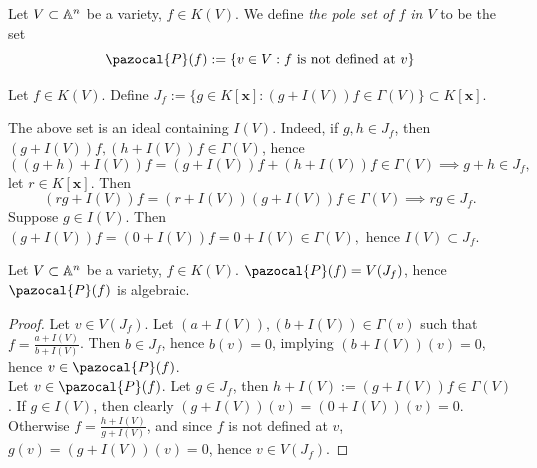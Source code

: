 \begin{definition}
    Let $V\subset \mathbb{A}^n$ be a variety, $f\in K(V)$. We define \textit{the pole set of $f$ in $V$} to be the set
    $$\pazocal{P}(f):= \left\{ v\in V : f \text{ is not defined at } v \right\}$$
\end{definition}
\begin{definition}
    Let $f\in K(V)$. Define $J_f:=\{g\in K[\mathbf{x}]: (g+I(V))f\in \Gamma(V)\}\subset K[\mathbf{x}].$
\end{definition}
\begin{remark}\label{IdealGeneratingPoleSet}
    The above set is an ideal containing $I(V)$. Indeed, if $g,h\in J_f$, then $(g+I(V))f,(h+I(V))f\in \Gamma(V)$, hence 
    $$((g+h)+I(V))f=(g+I(V))f+(h+I(V))f\in \Gamma(V)\implies g+h\in J_f,$$
    let $r\in K[\mathbf{x}]$. Then 
    $$(rg+I(V))f=(r+I(V))(g+I(V))f\in \Gamma(V)\implies rg\in J_f.$$
    Suppose $g\in I(V)$. Then $(g+I(V))f=(0+I(V))f=0+I(V)\in \Gamma(V),$ hence $I(V)\subset J_f$.
\end{remark}
\begin{lemma}\label{PoleSetIsAlgebraic}
    Let $V\subset \mathbb{A}^n$ be a variety, $f\in K(V)$. $\pazocal{P}(f)=V(J_f)$, hence $\pazocal{P}(f)$ is algebraic.
\end{lemma}
\begin{proof}
    Let $v\in V(J_f)$. Let $(a+I(V)),(b+I(V))\in \Gamma(v)$ such that $f = \frac{a+I(V)}{b+I(V)}$. Then $b\in J_f$, hence $b(v)=0$, implying $(b+I(V))(v)=0$, hence $v\in \pazocal{P}(f)$.\\
    Let $v\in \pazocal{P}(f)$. Let $g\in J_f$, then $h+I(V):= (g+I(V))f\in\Gamma(V)$. If $g\in I(V)$, then clearly $(g+I(V))(v)=(0+I(V))(v)=0$. Otherwise $f = \frac{h+I(V)}{g+I(V)}$, and since $f$ is not defined at $v$, $g(v)=(g+I(V))(v)=0$, hence $v\in V(J_f)$.
\end{proof}
